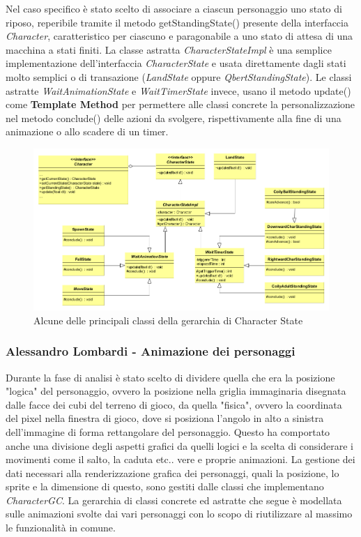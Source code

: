 \documentclass[a4paper,12pt]{report}
\begin{document}
Nel caso specifico  è stato scelto di associare a ciascun personaggio uno stato di riposo, reperibile tramite il metodo getStandingState() presente della interfaccia \emph{Character}, caratteristico per ciascuno e paragonabile a uno stato di attesa di una macchina a stati finiti. La classe astratta \emph{CharacterStateImpl} è una semplice implementazione dell'interfaccia \emph{CharacterState} e usata direttamente dagli stati molto semplici o di transazione (\emph{LandState} oppure \emph{QbertStandingState}). Le classi astratte \emph{WaitAnimationState} e \emph{WaitTimerState} invece, usano il metodo update() come \textbf{Template Method} per permettere alle classi concrete la personalizzazione nel metodo conclude() delle azioni da svolgere, rispettivamente alla fine di una animazione o allo scadere di un timer.

\begin{figure}[H]
\centering{}
\includegraphics[width=\linewidth]{img/CharacterStates}
\caption{Alcune delle principali classi della gerarchia di Character State}
\label{img:GerarchiaCGC}
\end{figure}


\begin{flushright}
\item\subsubsection{Alessandro Lombardi - Animazione dei personaggi}
\end{flushright}

Durante la fase di analisi è stato scelto di dividere quella che era la posizione "logica" del personaggio, ovvero la posizione nella griglia immaginaria disegnata dalle facce dei cubi del terreno di gioco, da quella "fisica", ovvero la coordinata del pixel nella finestra di gioco, dove si posiziona l'angolo in alto a sinistra dell'immagine di forma rettangolare del personaggio. Questo ha comportato anche una divisione degli aspetti grafici da quelli logici e la scelta di considerare i movimenti come il salto, la caduta etc.. vere e proprie animazioni. La gestione dei dati necessari alla renderizzazione grafica dei personaggi, quali la posizione, lo sprite e la dimensione di questo, sono gestiti dalle classi che implementano \emph{CharacterGC}. La gerarchia di classi concrete ed astratte che segue è modellata sulle animazioni svolte dai vari personaggi con lo scopo di riutilizzare al massimo le funzionalità in comune.
\end{document}
